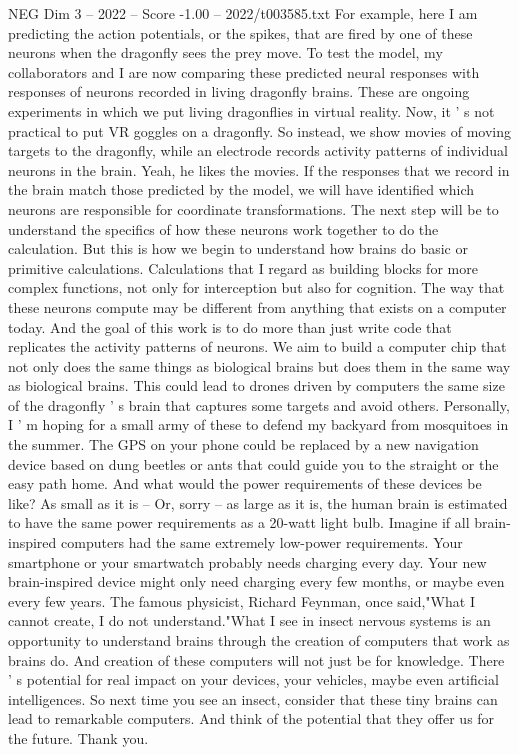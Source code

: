 \begin{textsample}{NEG Dim 3 – 2022 – Score -1.00 – 2022/t003585.txt}
For example, here I am predicting the action potentials, or the spikes, that are fired by one of these neurons when the dragonfly sees the prey move.
To test the model, my collaborators and I are now comparing these predicted neural responses with responses of neurons recorded in living dragonfly brains.
These are ongoing experiments in which we put living dragonflies in virtual reality.
Now, it ' s not practical to put VR goggles on a dragonfly.
So instead, we show movies of moving targets to the dragonfly, while an electrode records activity patterns of individual neurons in the brain.
Yeah, he likes the movies.
If the responses that we record in the brain match those predicted by the model, we will have identified which neurons are responsible for coordinate transformations.
The next step will be to understand the specifics of how these neurons work together to do the calculation.
But this is how we begin to understand how brains do basic or primitive calculations.
Calculations that I regard as building blocks for more complex functions, not only for interception but also for cognition.
The way that these neurons compute may be different from anything that exists on a computer today.
And the goal of this work is to do more than just write code that replicates the activity patterns of neurons.
We aim to build a computer chip that not only does the same things as biological brains but does them in the same way as biological brains.
This could lead to drones driven by computers the same size of the dragonfly ' s brain that captures some targets and avoid others.
Personally, I ' m hoping for a small army of these to defend my backyard from mosquitoes in the summer.
The GPS on your phone could be replaced by a new navigation device based on dung beetles or ants that could guide you to the straight or the easy path home.
And what would the power requirements of these devices be like?
As small as it is -- Or, sorry -- as large as it is, the human brain is estimated to have the same power requirements as a 20-watt light bulb.
Imagine if all brain-inspired computers had the same extremely low-power requirements.
Your smartphone or your smartwatch probably needs charging every day.
Your new brain-inspired device might only need charging every few months, or maybe even every few years.
The famous physicist, Richard Feynman, once said,"What I cannot create, I do not understand."What I see in insect nervous systems is an opportunity to understand brains through the creation of computers that work as brains do.
And creation of these computers will not just be for knowledge.
There ' s potential for real impact on your devices, your vehicles, maybe even artificial intelligences.
So next time you see an insect, consider that these tiny brains can lead to remarkable computers.
And think of the potential that they offer us for the future.
Thank you.

\end{textsample}
